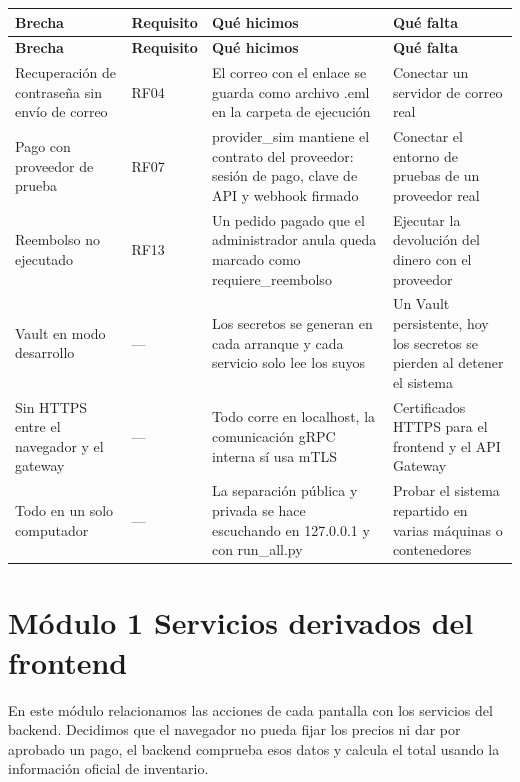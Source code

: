 \documentclass[10pt,letterpaper]{article}
\begin{document}
{\footnotesize
\begin{longtable}{|P{\tabcolsep\relax}|P{\tabcolsep\relax}|P{\tabcolsep\relax}|P{\tabcolsep\relax}|}
\hline
\textbf{Brecha} & \textbf{Requisito} & \textbf{Qué hicimos} & \textbf{Qué falta} \\ \hline
\endfirsthead
\hline
\textbf{Brecha} & \textbf{Requisito} & \textbf{Qué hicimos} & \textbf{Qué falta} \\ \hline
\endhead
Recuperación de contraseña sin envío de correo & RF04 & El correo con el enlace se guarda como archivo .eml en la carpeta de ejecución & Conectar un servidor de correo real \\ \hline
Pago con proveedor de prueba & RF07 & provider\_\allowbreak{}sim mantiene el contrato del proveedor: sesión de pago, clave de API y webhook firmado & Conectar el entorno de pruebas de un proveedor real \\ \hline
Reembolso no ejecutado & RF13 & Un pedido pagado que el administrador anula queda marcado como requiere\_\allowbreak{}reembolso & Ejecutar la devolución del dinero con el proveedor \\ \hline
Vault en modo desarrollo & — & Los secretos se generan en cada arranque y cada servicio solo lee los suyos & Un Vault persistente, hoy los secretos se pierden al detener el sistema \\ \hline
Sin HTTPS entre el navegador y el gateway & — & Todo corre en localhost, la comunicación gRPC interna sí usa mTLS & Certificados HTTPS para el frontend y el API Gateway \\ \hline
Todo en un solo computador & — & La separación pública y privada se hace escuchando en 127.0.0.1 y con run\_\allowbreak{}all.\allowbreak{}py & Probar el sistema repartido en varias máquinas o contenedores \\ \hline
\end{longtable}}

\section*{Módulo 1 Servicios derivados del frontend}
En este módulo relacionamos las acciones de cada pantalla con los servicios del backend. Decidimos que el navegador no pueda fijar los precios ni dar por aprobado un pago, el backend comprueba esos datos y calcula el total usando la información oficial de inventario.
\end{document}
